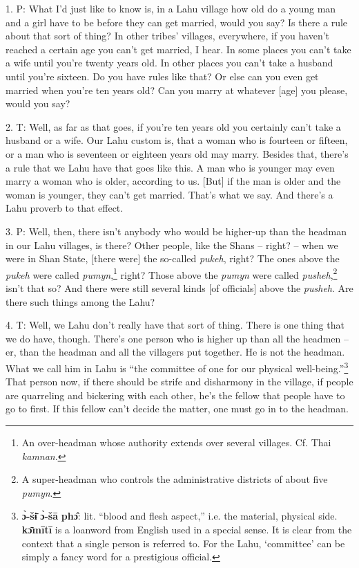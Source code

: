\setcounter{footnote}{0}

1. P: What I'd just like to know is, in a Lahu village how old do a young man and
a girl have to be before they can get married, would you say? Is there a rule about
that sort of thing? In other tribes' villages, everywhere, if you haven't reached
a certain age you can't get married, I hear. In some places you can't take a wife
until you're twenty years old. In other places you can't take a husband until you're
sixteen. Do you have rules like that? Or else can you even get married when you're
ten years old? Can you marry at whatever [age] you please, would you say?

2. T: Well, as far as that goes, if you're ten years old you certainly can't take
a husband or a wife. Our Lahu custom is, that a woman who is fourteen or fifteen,
or a man who is seventeen or eighteen years old may marry. Besides that, there's
a rule that we Lahu have that goes like this. A man who is younger may even marry
a woman who is older, according to us. [But] if the man is older and the woman
is younger, they can't get married. That's what we say. And there's a Lahu proverb
to that effect.

3. P:  Well, then, there isn't anybody who
would be higher-up than the headman in our Lahu villages, is there? Other people,
like the Shans -- right? -- when we were in Shan State, [there were] the so-called
\textit{pukeh}, right? The ones above the \textit{pukeh} were called \textit{pumyn},\footnote{An over-headman whose authority extends over several villages. Cf. Thai \textit{kamnan}.}
right? Those above the \textit{pumyn} were called \textit{pusheh},\footnote{A super-headman who controls the administrative districts of about five \textit{pumyn}.} isn't that
so? And there were still several kinds [of officials] above the \textit{pusheh}.
Are there such things among the Lahu?

4. T: Well, we Lahu don't really have that sort of thing. There is one thing that
we do have, though. There's one person who is higher up than all the headmen --
er, than the headman and all the villagers put together. He is not the headman.
What we call him in Lahu is ``the committee of one for our physical well-being.''\footnote{\textbf{ɔ̀-šɨ̄} \textbf{ɔ̀-šā} \textbf{phɔ̂}: lit. ``blood and flesh aspect,'' i.e. the material, physical side. \textbf{kɔ̄mītī} is a loanword from English used in a special sense. It is clear from the context that a single person is referred to. For the Lahu, `committee' can be simply a fancy word for a prestigious official.}
That person now, if there should be strife and disharmony in the village, if people
are quarreling and bickering with each other, he's the fellow that people have
to go to first. If this fellow can't decide the matter, one must go in to the headman.

